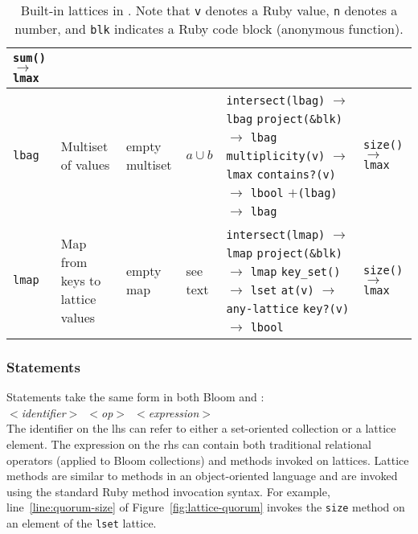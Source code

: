 \begin{table*}[t]
\begin{center}
\begin{tabular}{|l|p{0.88in}|l|l|p{1.44in}|p{1.00in}|}
\texttt{sum()} $\to$ \texttt{lmax} \\
\hline
\texttt{lbag} & Multiset of values & empty multiset & $a \cup b$ &
\texttt{intersect(lbag)} $\to$ \texttt{lbag}\newline
\texttt{project(\&blk)} $\to$ \texttt{lbag}\newline
\texttt{multiplicity(v)} $\to$ \texttt{lmax}\newline
\texttt{contains?(v)} $\to$ \texttt{lbool}\newline
\texttt{$\mathtt{+}$(lbag)} $\to$ \texttt{lbag}
& \texttt{size()} $\to$ \texttt{lmax}\\
\hline
\texttt{lmap} & Map from keys to \newline{}lattice values & empty map & see text&
\texttt{intersect(lmap)} $\to$ \texttt{lmap}\newline
\texttt{project(\&blk)} $\to$ \texttt{lmap}\newline
\texttt{key\_set()} $\to$ \texttt{lset}\newline
\texttt{at(v)} $\to$ \texttt{any-lattice}\newline
\texttt{key?(v)} $\to$ \texttt{lbool}
& \texttt{size()} $\to$ \texttt{lmax}\\
\hline
\end{tabular}
\caption{Built-in lattices in \lang. Note that \texttt{v} denotes a Ruby value,
  \texttt{n} denotes a number, and \texttt{blk} indicates a Ruby code block
  (anonymous function).}
\label{tbl:built-in-lattices}
\end{center}
\end{table*}


\subsubsection{Statements}
Statements take the same form in both Bloom and \lang: \\ \noindent
\mbox{\hspace{0.25in}\emph{$<$identifier$>$ $<$op$>$
    $<$expression$>$}}\\ \noindent
The identifier on the lhs can refer to either a set-oriented collection or a
lattice element. The expression on the rhs can contain both traditional
relational operators (applied to Bloom collections) and methods invoked on
lattices.  Lattice methods are similar to methods in an object-oriented language
and are invoked using the standard Ruby method invocation syntax. For example,
line~\ref{line:quorum-size} of Figure~\ref{fig:lattice-quorum} invokes the
\texttt{size} method on an element of the \texttt{lset} lattice.

